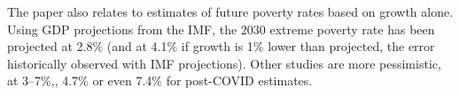 The paper also relates to estimates of future poverty rates based on growth alone. Using GDP projections from the IMF, the 2030 extreme poverty rate has been projected at 2.8\% (and at 4.1\% if growth is 1\% lower than projected, the error historically observed with IMF projections).\cite{karver_mdgs_2012} Other studies are more pessimistic, at 3--7\%,\cite{chandy_final_2013,bicaba_can_2017}, 4.7\%\cite{manuel_financing_2018} or even 7.4\% for post-COVID estimates.\cite{lakner_how_2022} 

